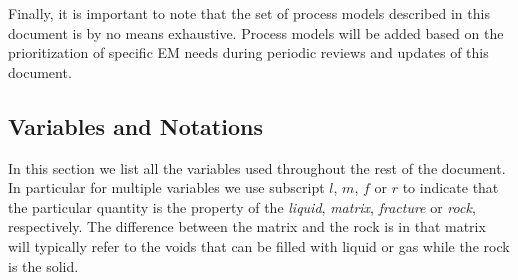 Finally, it is important to note that the set of process models described
in this document is by no means exhaustive.  Process models will be
added based on the prioritization of specific EM needs during periodic reviews 
and updates of this document.



\subsection{Variables and Notations}
\label{sec:notations}


\def\bnabla{{\boldsymbol{\nabla}}}
\def\bg{{\boldsymbol{g}}}
\def\bq{{\boldsymbol{q}}}
\def\bx{{\boldsymbol{x}}}
\def\bJ{{\boldsymbol{J}}}
\def\K{{\mathbb K}}

\def\Frac{\displaystyle \frac}

\def\ucdot{{\,\cdot\,}}
\def\ukg{{\rm kg}}
\def\um{{\rm m}}
\def\us{{\rm s}}
\def\umol{{\rm mol}}
\def\upa{{\rm Pa}}


In this section we list all the variables used throughout the rest of the document.
In particular for multiple variables we use subscript 
$l$, $m$, $f$ or $r$ to indicate that the particular quantity 
is the property of the  
\emph{liquid}, \emph{matrix}, \emph{fracture} or \emph{rock}, respectively.
The difference between the matrix and the rock is in that matrix will typically refer 
to the voids that can be filled with liquid or gas while the rock is the solid.


